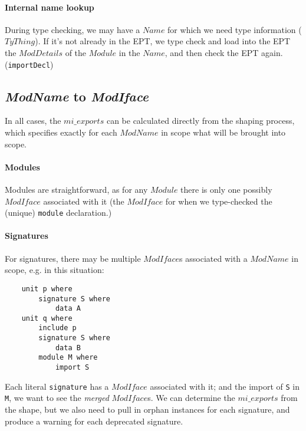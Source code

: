 \documentclass{article}
\newcommand{\I}[1]{\ensuremath{\mathit{#1}}}
\begin{document}
\paragraph{Internal name lookup}  During type checking, we may have
a \I{Name} for which we need type information (\I{TyThing}).  If it's not already in the
EPT, we type check and load
into the EPT the \I{ModDetails} of the \I{Module} in the \I{Name},
and then check the EPT again. (\verb|importDecl|)

\subsection{\textit{ModName} to \textit{ModIface}}

In all cases, the \I{mi\_exports} can be calculated directly from the
shaping process, which specifies exactly for each \I{ModName} in scope
what will be brought into scope.

\paragraph{Modules} Modules are straightforward, as for any
\I{Module} there is only one possibly \I{ModIface} associated
with it (the \I{ModIface} for when we type-checked the (unique) \verb|module|
declaration.)

\paragraph{Signatures} For signatures, there may be multiple \I{ModIface}s
associated with a \I{ModName} in scope, e.g. in this situation:

\begin{verbatim}
    unit p where
        signature S where
            data A
    unit q where
        include p
        signature S where
            data B
        module M where
            import S
\end{verbatim}
%
Each literal \verb|signature| has a \I{ModIface} associated with it; and
the import of \verb|S| in \verb|M|, we want to see the \emph{merged}
\I{ModIface}s.  We can determine the \I{mi\_exports} from the shape,
but we also need to pull in orphan instances for each signature, and
produce a warning for each deprecated signature.
\end{document}
